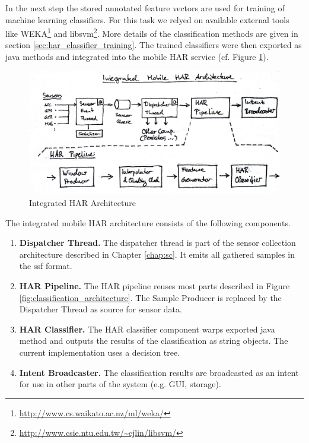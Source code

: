 In the next step the stored annotated feature vectors are used for
training of machine learning classifiers. For this task we relyed on 
available external tools like
WEKA\footnote{\url{http://www.cs.waikato.ac.nz/ml/weka/}}
and libsvm\footnote{\url{http://www.csie.ntu.edu.tw/~cjlin/libsvm/}}.
More details of the classification methods are given in section
\ref{sec:har_classifier_training}.
The trained classifiers were then exported as java methods and
integrated into the mobile HAR service (cf. Figure \ref{fig:integrated_har}).

\begin{figure}[htbp]
\centering
\includegraphics[width=\textwidth]{img/har/integration.jpg}
\caption{Integrated HAR Architecture}\label{fig:integrated_har}
\end{figure}

The integrated mobile HAR architecture consists of the following components.
\begin{enumerate}
\item {\bf Dispatcher Thread.} The dispatcher thread is part of
  the sensor collection architecture described in Chapter
  \ref{chap:sc}. It emits all gathered samples in the ssf format.
\item {\bf HAR Pipeline.} The HAR pipeline reuses most parts described
  in Figure \ref{fig:classification_architecture}. The Sample Producer
  is replaced by the Dispatcher Thread as source for sensor data.
\item {\bf HAR Classifier.} The HAR classifier component warps
  exported java method and outputs the results of the classification
  as string objects. The current implementation uses a decision tree.
\item {\bf Intent Broadcaster.} The classification results are
  broadcasted as an intent for use in other parts of the system
  (e.g. GUI, storage).
\end{enumerate}

